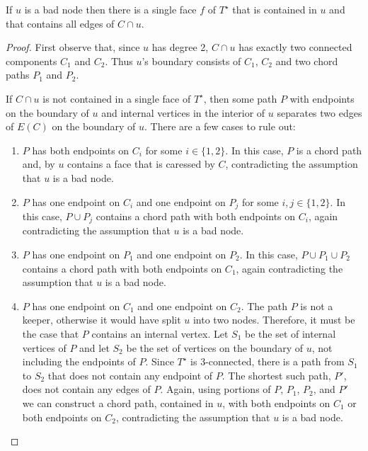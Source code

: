 \documentclass{patmorin}
\newcommand{\dual}[1]{{#1}^\star}
\begin{document}
\begin{lem}
   If $u$ is a bad node then there is a single face $f$ of $\dual{T}$
   that is contained in $u$ and that contains all edges of $C\cap u$.
\end{lem}

\begin{proof}
   First observe that, since $u$ has degree 2, $C\cap u$ has exactly
   two connected components $C_1$ and $C_2$. Thus $u$'s boundary
   consists of $C_1$, $C_2$ and two chord paths $P_1$ and $P_2$.

   If $C\cap u$ is not contained in a single face of $\dual{T}$, then
   some path $P$ with endpoints on the boundary of $u$ and internal
   vertices in the interior of $u$ separates two edges of $E(C)$ on the
   boundary of $u$.  There are a few cases to rule out:
   \begin{enumerate}
       \item $P$ has both endpoints on $C_i$ for some $i\in\{1,2\}$. In
       this case, $P$ is a chord path and, by 
       $u$ contains a face that is caressed by $C$, contradicting the
       assumption that $u$ is a bad node.

       \item $P$ has one endpoint on $C_i$ and one endpoint on $P_j$
       for some $i,j\in\{1,2\}$.  In this case, $P\cup P_j$ contains a
       chord path with both endpoints on $C_i$, again contradicting the
       assumption that $u$ is a bad node.

       \item $P$ has one endpoint on $P_1$ and one endpoint on $P_2$.
       In this case, $P\cup P_1\cup P_2$ contains a chord path with both
       endpoints on $C_1$, again contradicting the assumption that $u$
       is a bad node.

       \item $P$ has one endpoint on $C_1$ and one endpoint on $C_2$.
       The path $P$ is not a keeper, otherwise it would have split $u$
       into two nodes.	Therefore, it must be the case that $P$ contains
       an internal vertex.  Let $S_1$ be the set of internal vertices
       of $P$ and let $S_2$ be the set of vertices on the boundary
       of $u$, not including the endpoints of $P$.  Since $\dual{T}$
       is 3-connected, there is a path from $S_1$ to $S_2$ that does
       not contain any endpoint of $P$.  The shortest such path, $P'$,
       does not contain any edges of $P$.  Again, using portions of $P$,
       $P_1$, $P_2$, and $P'$ we can construct a chord path, contained
       in $u$, with both endpoints on $C_1$ or both endpoints on $C_2$,
       contradicting the assumption that $u$ is a bad node.
\end{enumerate}
\end{proof}
\end{document}
